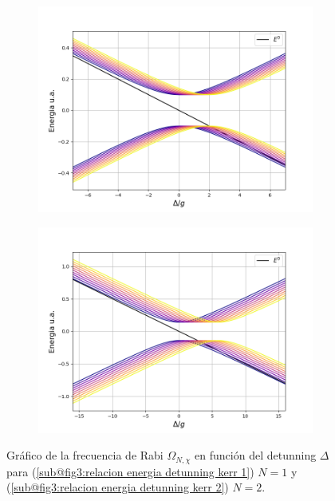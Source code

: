 \begin{figure}[h]
    \centering
    \begin{subfigure}[h]{0.49\textwidth}
        \centering
        \includegraphics[width=\textwidth]{figuras/ch3/relacion energia detunning jcm simple kerr.png}
        \caption{}
        \label{fig3:relacion energia detunning kerr 1}
    \end{subfigure}
    \hfill
    \begin{subfigure}[h]{0.49\textwidth}
        \centering
        \includegraphics[width=\textwidth]{figuras/ch3/relacion energia detunning jcm simple kerr 2.png}
        \caption{}
        \label{fig3:relacion energia detunning kerr 2}
    \end{subfigure}
    \caption{Gráfico de la frecuencia de Rabi $\Omega_{N,\chi}$ en función del detunning $\Delta$ para (\ref{sub@fig3:relacion energia detunning kerr 1}) $N=1$ y (\ref{sub@fig3:relacion energia detunning kerr 2}) $N=2$.}
    \label{fig3:relacion energia detunning kerr}
\end{figure}

